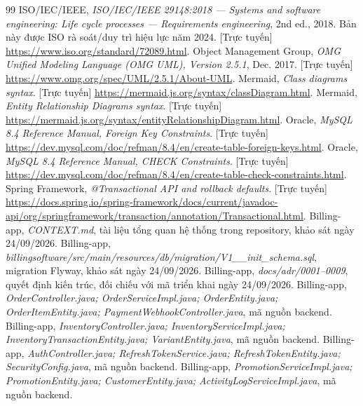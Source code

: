 \documentclass[12pt,a4paper,oneside]{report}
\begin{document}
\begin{thebibliography}{99}
 ISO/IEC/IEEE, \textit{ISO/IEC/IEEE 29148:2018 — Systems and software engineering: Life cycle processes — Requirements engineering}, 2nd ed., 2018. Bản này được ISO rà soát/duy trì hiệu lực năm 2024. [Trực tuyến] \url{https://www.iso.org/standard/72089.html}.
 Object Management Group, \textit{OMG Unified Modeling Language (OMG UML), Version 2.5.1}, Dec. 2017. [Trực tuyến] \url{https://www.omg.org/spec/UML/2.5.1/About-UML}.
 Mermaid, \textit{Class diagrams syntax}. [Trực tuyến] \url{https://mermaid.js.org/syntax/classDiagram.html}.
 Mermaid, \textit{Entity Relationship Diagrams syntax}. [Trực tuyến] \url{https://mermaid.js.org/syntax/entityRelationshipDiagram.html}.
 Oracle, \textit{MySQL 8.4 Reference Manual, Foreign Key Constraints}. [Trực tuyến] \url{https://dev.mysql.com/doc/refman/8.4/en/create-table-foreign-keys.html}.
 Oracle, \textit{MySQL 8.4 Reference Manual, CHECK Constraints}. [Trực tuyến] \url{https://dev.mysql.com/doc/refman/8.4/en/create-table-check-constraints.html}.
 Spring Framework, \textit{@Transactional API and rollback defaults}. [Trực tuyến] \url{https://docs.spring.io/spring-framework/docs/current/javadoc-api/org/springframework/transaction/annotation/Transactional.html}.
 Billing-app, \textit{CONTEXT.md}, tài liệu tổng quan hệ thống trong repository, khảo sát ngày 24/09/2026.
 Billing-app, \textit{billingsoftware/src/main/resources/db/migration/V1\_\_init\_schema.sql}, migration Flyway, khảo sát ngày 24/09/2026.
 Billing-app, \textit{docs/adr/0001--0009}, quyết định kiến trúc, đối chiếu với mã triển khai ngày 24/09/2026.
 Billing-app, \textit{OrderController.java; OrderServiceImpl.java; OrderEntity.java; OrderItemEntity.java; PaymentWebhookController.java}, mã nguồn backend.
 Billing-app, \textit{InventoryController.java; InventoryServiceImpl.java; InventoryTransactionEntity.java; VariantEntity.java}, mã nguồn backend.
 Billing-app, \textit{AuthController.java; RefreshTokenService.java; RefreshTokenEntity.java; SecurityConfig.java}, mã nguồn backend.
 Billing-app, \textit{PromotionServiceImpl.java; PromotionEntity.java; CustomerEntity.java; ActivityLogServiceImpl.java}, mã nguồn backend.
\end{thebibliography}
\end{document}

